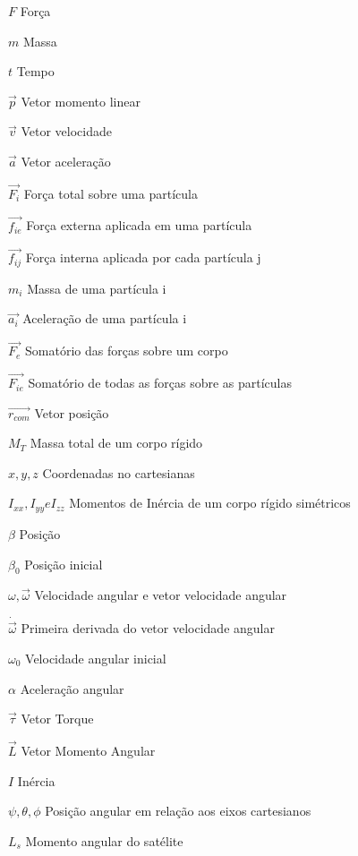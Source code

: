 \begin{simbolos}
  \item[$F$] Força
  \item[$m$] Massa
  \item[$t$] Tempo
  \item[$\vec{p}$] Vetor momento linear
  \item[$\vec{v}$] Vetor velocidade
  \item[$\vec{a}$] Vetor aceleração
  \item[$\vec{F_i}$] Força total sobre uma partícula
  \item[$\vec{f_{ie}}$] Força externa aplicada em uma partícula
  \item[$\vec{f_{ij}}$] Força interna aplicada por cada partícula j
  \item[$m_i$] Massa de uma partícula i
  \item[$\vec{a_i}$] Aceleração de uma partícula i
  \item[$\vec{F_e}$] Somatório das forças sobre um corpo
  \item[$\vec{F_{ie}}$] Somatório de todas as forças sobre as partículas
  \item[$\vec{r_{com}}$] Vetor posição 
  \item[$M_T$] Massa total de um corpo rígido
  \item[$x,y,z$] Coordenadas no cartesianas
  \item[$I_{xx}, I_{yy}  e  I_{zz}$] Momentos de Inércia de um corpo rígido simétricos 
  \item[$\beta$] Posição
  \item[$\beta_0$] Posição inicial
  \item[$\omega,  \vec{\omega}$] Velocidade angular e vetor velocidade angular
  \item[$\dot{\vec{\omega}}$] Primeira derivada do vetor velocidade angular
  \item[$\omega_0$] Velocidade angular inicial
  \item[$\alpha$] Aceleração angular
  \item[$\vec{\tau}$] Vetor Torque
  \item[$\vec{L}$] Vetor Momento Angular
  \item[$I$] Inércia
  \item[$\psi, \theta, \phi$] Posição angular em relação aos eixos cartesianos
  \item[$L_s$] Momento angular do satélite

\end{simbolos}
